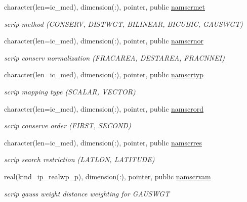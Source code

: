 \begin{DoxyCompactItemize}
character(len=ic\+\_\+med), dimension(\+:), pointer, public \hyperlink{namespacemod__oasis__namcouple_a51c19e0892a72acc3dca2adb046ed175}{namscrmet}
\begin{DoxyCompactList}\small\item\em scrip method (C\+O\+N\+S\+E\+RV, D\+I\+S\+T\+W\+GT, B\+I\+L\+I\+N\+E\+AR, B\+I\+C\+U\+B\+IC, G\+A\+U\+S\+W\+GT) \end{DoxyCompactList}\item 
character(len=ic\+\_\+med), dimension(\+:), pointer, public \hyperlink{namespacemod__oasis__namcouple_a392f40531007d5dcc084e6ad4a393fd7}{namscrnor}
\begin{DoxyCompactList}\small\item\em scrip conserv normalization (F\+R\+A\+C\+A\+R\+EA, D\+E\+S\+T\+A\+R\+EA, F\+R\+A\+C\+N\+N\+EI) \end{DoxyCompactList}\item 
character(len=ic\+\_\+med), dimension(\+:), pointer, public \hyperlink{namespacemod__oasis__namcouple_a8ddbaabd22bbf485888b1df5f3578909}{namscrtyp}
\begin{DoxyCompactList}\small\item\em scrip mapping type (S\+C\+A\+L\+AR, V\+E\+C\+T\+OR) \end{DoxyCompactList}\item 
character(len=ic\+\_\+med), dimension(\+:), pointer, public \hyperlink{namespacemod__oasis__namcouple_ac881ced105604879ada860fabd677481}{namscrord}
\begin{DoxyCompactList}\small\item\em scrip conserve order (F\+I\+R\+ST, S\+E\+C\+O\+ND) \end{DoxyCompactList}\item 
character(len=ic\+\_\+med), dimension(\+:), pointer, public \hyperlink{namespacemod__oasis__namcouple_a6a95ddbbbc615e0257d93d05e4546239}{namscrres}
\begin{DoxyCompactList}\small\item\em scrip search restriction (L\+A\+T\+L\+ON, L\+A\+T\+I\+T\+U\+DE) \end{DoxyCompactList}\item 
real(kind=ip\+\_\+realwp\+\_\+p), dimension(\+:), pointer, public \hyperlink{namespacemod__oasis__namcouple_a45b410743ce74a9824d44b329ba323ba}{namscrvam}
\begin{DoxyCompactList}\small\item\em scrip gauss weight distance weighting for G\+A\+U\+S\+W\+GT \end{DoxyCompactList}\item 

\end{DoxyCompactItemize}
